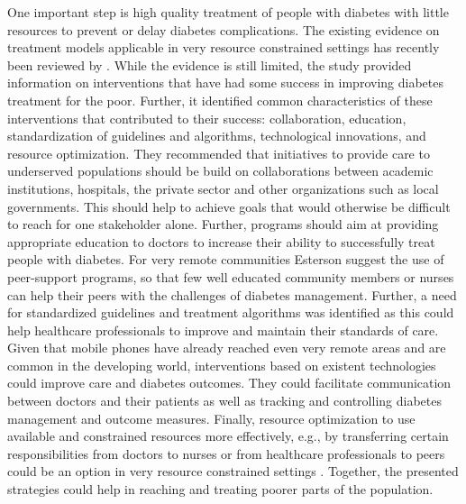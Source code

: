 One important step is high quality treatment of people with diabetes with little resources to prevent or delay diabetes complications. The existing evidence on treatment models applicable in very resource constrained settings has recently been reviewed by \textcite{Esterson2014}. While the evidence is still limited, the study provided information on interventions that have had some success in improving diabetes treatment for the poor. Further, it identified common characteristics of these interventions that contributed to their success: collaboration, education, standardization of guidelines and algorithms, technological innovations, and resource optimization. They recommended that initiatives to provide care to underserved populations should be build on collaborations between academic institutions, hospitals, the private sector and other organizations such as local governments. This should help to achieve goals that would otherwise be difficult to reach for one stakeholder alone. Further, programs should aim at providing appropriate education to doctors to increase their ability to successfully treat people with diabetes. For very remote communities Esterson suggest the use of peer-support programs, so that few well educated community members or nurses can help their peers with the challenges of diabetes management. Further, a need for standardized guidelines and treatment algorithms was identified as this could help healthcare professionals to improve and maintain their standards of care. Given that mobile phones have already reached even very remote areas and are common in the developing world, interventions based on existent technologies could improve care and diabetes outcomes. They could facilitate communication between doctors and their patients as well as tracking and controlling diabetes management and outcome measures. Finally, resource optimization to use available and constrained resources more effectively, e.g., by transferring certain responsibilities from doctors to nurses or from healthcare professionals to peers could be an option in very resource constrained settings \parencite{Esterson2014}. Together, the presented strategies could help in reaching and treating poorer parts of the population.

